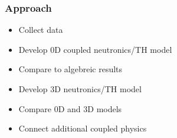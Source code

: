 \begin{frame}[fragile]
  \frametitle{Approach}
  \begin{itemize}
    \item Collect data
    \item Develop 0D coupled neutronics/TH model
    \item Compare to algebreic results
    \item Develop 3D neutronics/TH model
    \item Compare 0D and 3D models
    \item Connect additional coupled physics
  \end{itemize}

\end{frame}
